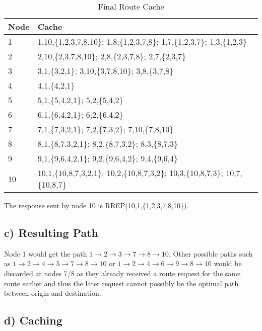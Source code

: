 \documentclass[a4paper, 11 pt, article, accentcolor=tud7b]{tudreport}
\begin{document}
	\begin{table}[h]
	  \centering
	  \begin{tabular}{| l | l |}
	    \hline
	    Node & Cache \\ \hline
	    1    & 1,10,\{1,2,3,7,8,10\}; 1,8,\{1,2,3,7,8\}; 1,7,\{1,2,3,7\}; 1,3,\{1,2,3\}\\ \hline
	    2    & 2,10,\{2,3,7,8,10\}; 2,8,\{2,3,7,8\}; 2,7,\{2,3,7\}\\ \hline
	    3    & 3,1,\{3,2,1\}; 3,10,\{3,7,8,10\}; 3,8,\{3,7,8\}\\ \hline
	    4    & 4,1,\{4,2,1\}\\ \hline
	    5    & 5,1,\{5,4,2,1\}; 5,2,\{5,4,2\}\\ \hline
	    6    & 6,1,\{6,4,2,1\}; 6,2,\{6,4,2\}\\ \hline
	    7    & 7,1,\{7,3,2,1\}; 7,2,\{7,3,2\}; 7,10,\{7,8,10\}\\ \hline
	    8    & 8,1,\{8,7,3,2,1\}; 8,2,\{8,7,3,2\}; 8,3,\{8,7,3\}\\ \hline
	    9    & 9,1,\{9,6,4,2,1\}; 9,2,\{9,6,4,2\}; 9,4,\{9,6,4\}\\ \hline
	    10   & 10,1,\{10,8,7,3,2,1\}; 10,2,\{10,8,7,3,2\}; 10,3,\{10,8,7,3\}; 10,7,\{10,8,7\}\\ \hline
	  \end{tabular}
	  \caption{Final Route Cache}
	\end{table}
	
	\FloatBarrier
	
	The response sent by node 10 is RREP(10,1,\{1,2,3,7,8,10\}).
	
	\subsection*{c) Resulting Path}
	
	Node 1 would get the path $1 \rightarrow 2 \rightarrow 3 \rightarrow 7 \rightarrow 8 \rightarrow 10$. Other possible paths such as $1 \rightarrow 2 \rightarrow 4 \rightarrow 5 \rightarrow 7 \rightarrow 8 \rightarrow 10$ or $1 \rightarrow 2 \rightarrow 4 \rightarrow 6 \rightarrow 9 \rightarrow 8 \rightarrow 10$ would be discarded at nodes 7/8 as they already received a route request for the same route earlier and thus the later request cannot possibly be the optimal path between origin and destination.
	
	\subsection*{d) Caching}
	
\end{document}
